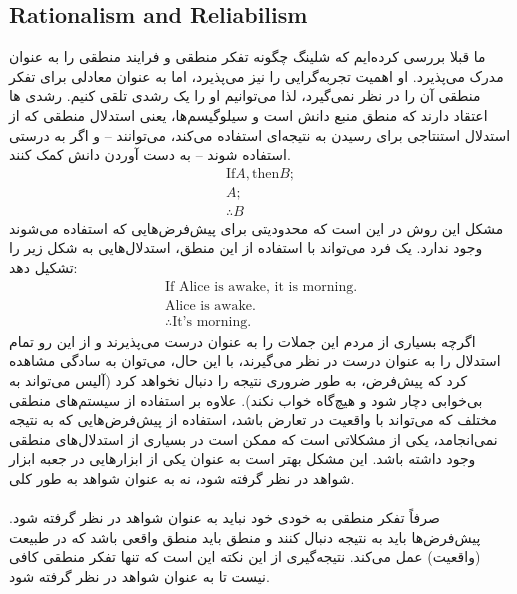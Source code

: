\documentclass[10pt,a4paper]{article}
\begin{document}
                \subsection{Rationalism and Reliabilism}ما قبلا بررسی کرده‌ایم که شلینگ چگونه تفکر منطقی و فرایند منطقی را به عنوان مدرک می‌پذیرد. او اهمیت تجربه‌گرایی را نیز می‌پذیرد، اما به عنوان معادلی برای تفکر منطقی آن را در نظر نمی‌گیرد، لذا می‌توانیم او را یک رشدی تلقی کنیم. رشدی ها اعتقاد دارند که منطق منبع دانش است و سیلوگیسم‌ها، یعنی استدلال منطقی که از استدلال استنتاجی برای رسیدن به نتیجه‌ای استفاده می‌کند، می‌توانند -- و اگر به درستی استفاده شوند -- به دست آوردن دانش کمک کنند. \cite{enwiki:1145200450}
                \begin{align*}
                    \text{If} A, \text{then} B;
                    \\ A;
                    \\ \therefore B
                \end{align*}
مشکل این روش در این است که محدودیتی برای پیش‌فرض‌هایی که استفاده می‌شوند وجود ندارد. یک فرد می‌تواند با استفاده از این منطق، استدلال‌هایی به شکل زیر را تشکیل دهد:
                \begin{align*}
                    \text{If Alice is awake, it is morning.}
                    \\ \text {Alice is awake.}
                    \\ \therefore \text{It's morning.}
                \end{align*}
               اگرچه بسیاری از مردم این جملات را به عنوان درست می‌پذیرند و از این رو تمام استدلال را به عنوان درست در نظر می‌گیرند، با این حال، می‌توان به سادگی مشاهده کرد که پیش‌فرض، به طور ضروری نتیجه را دنبال نخواهد کرد (آلیس می‌تواند به بی‌خوابی دچار شود و هیچ‌گاه خواب نکند). علاوه بر استفاده از سیستم‌های منطقی مختلف که می‌تواند با واقعیت در تعارض باشد، استفاده از پیش‌فرض‌هایی که به نتیجه نمی‌انجامد، یکی از مشکلاتی است که ممکن است در بسیاری از استدلال‌های منطقی وجود داشته باشد. این مشکل بهتر است به عنوان یکی از ابزارهایی در جعبه ابزار شواهد در نظر گرفته شود، نه به عنوان شواهد به طور کلی.
                \\
                \\
                صرفاً تفکر منطقی به خودی خود نباید به عنوان شواهد در نظر گرفته شود. پیش‌فرض‌ها باید به نتیجه دنبال کنند و منطق باید منطق واقعی باشد که در طبیعت (واقعیت) عمل می‌کند. نتیجه‌گیری از این نکته این است که تنها تفکر منطقی کافی نیست تا به عنوان شواهد در نظر گرفته شود. \cite{CW/E}
                \\
\end{document}
